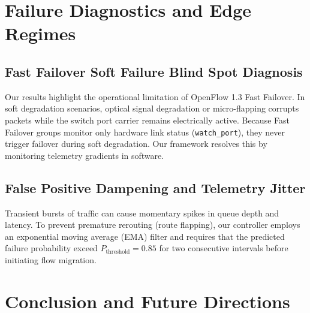 \documentclass[11pt,a4paper]{report}
\begin{document}
\chapter{Failure Diagnostics and Edge Regimes}

\section{Fast Failover Soft Failure Blind Spot Diagnosis}
Our results highlight the operational limitation of OpenFlow 1.3 Fast Failover. In soft degradation scenarios, optical signal degradation or micro-flapping corrupts packets while the switch port carrier remains electrically active. Because Fast Failover groups monitor only hardware link status (\texttt{watch\_port}), they never trigger failover during soft degradation. Our framework resolves this by monitoring telemetry gradients in software.

\section{False Positive Dampening and Telemetry Jitter}
Transient bursts of traffic can cause momentary spikes in queue depth and latency. To prevent premature rerouting (route flapping), our controller employs an exponential moving average (EMA) filter and requires that the predicted failure probability exceed $P_{\text{threshold}} = 0.85$ for two consecutive intervals before initiating flow migration.

\chapter{Conclusion and Future Directions}
\end{document}
